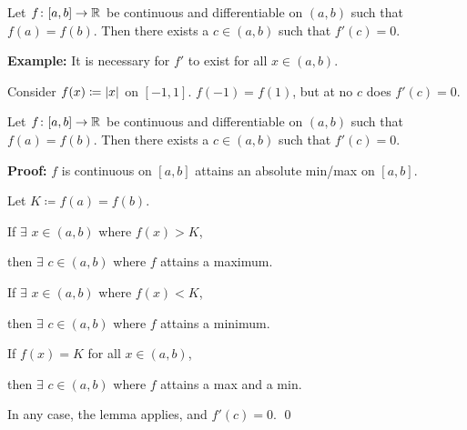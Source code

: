 \documentclass[10pt,aspectratio=169]{beamer}
\begin{document}
\begin{frame}
\begin{theorem}[Rolle]
Let $f \colon [a,b] \to {\mathbb{R}}$ be continuous and
differentiable on $(a,b)$ such that $f(a) = f(b)$.
Then there exists a $c \in (a,b)$ such that $f'(c) = 0$.
\end{theorem}

\pause
\begin{center}
\end{center}

\pause
\medskip

\textbf{Example:}
It is necessary for $f'$ to exist for all $x \in (a,b)$.

\pause
Consider $f(x) \coloneqq \left\lvert {x} \right\rvert$ on $[-1,1]$.
\quad
$f(-1) = f(1)$, but at no $c$ does $f'(c)=0$.
\end{frame}

\begin{frame}

\begin{theorem}[Rolle]
Let $f \colon [a,b] \to {\mathbb{R}}$ be continuous and
differentiable on $(a,b)$ such that $f(a) = f(b)$.
Then there exists a $c \in (a,b)$ such that $f'(c) = 0$.
\end{theorem}

\pause
\textbf{Proof:}
$f$ is continuous on $[a,b]$ \wthus attains an absolute min/max on $[a,b]$.

\pause
\medskip

Let $K \coloneqq f(a) = f(b)$.

\pause
\medskip

If $\exists$ $x \in (a,b)$ where $f(x) > K$,

\pause
then $\exists$ $c \in (a,b)$ where $f$ attains a maximum.

\pause
\medskip

If $\exists$ $x \in (a,b)$ where $f(x) < K$,

\pause
then $\exists$ $c \in (a,b)$ where $f$ attains a minimum.

\pause
\medskip

If $f(x) = K$ for all $x \in (a,b)$,

\pause
then $\exists$ $c \in (a,b)$ where $f$ attains a max and a min.

\pause
\medskip

In any case, the lemma applies, and $f'(c)=0$.
\qed

\end{frame}
\end{document}
